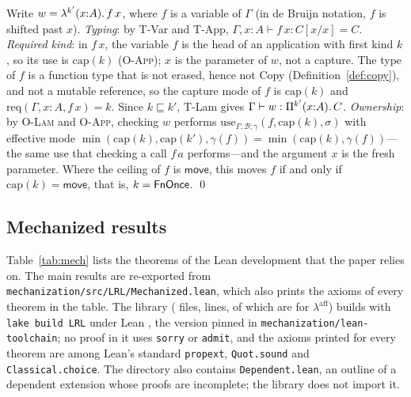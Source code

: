 Write $w = \lambda^{k'}(x{:}A).\,f\,x$, where $f$ is a variable of $\Gamma$ (in de Bruijn notation, $f$ is shifted past $x$).
\emph{Typing}: by T-Var and T-App, $\Gamma, x{:}A \vdash f\,x : C[x/x] = C$.
\emph{Required kind}: in $f\,x$, the variable $f$ is the head of an application with first kind $k$, so its use is $\mathrm{cap}(k)$ (\textsc{O-App}); $x$ is the parameter of $w$, not a capture.
The type of $f$ is a function type that is not erased, hence not Copy (Definition~\ref{def:copy}), and not a mutable reference, so the capture mode of $f$ is $\mathrm{cap}(k)$ and $\mathrm{req}(\Gamma, x{:}A, f\,x) = k$.
Since $k \sqsubseteq k'$, T-Lam gives $\Gamma \vdash w : \Pi^{k'}(x{:}A).\,C$.
\emph{Ownership}: by \textsc{O-Lam} and \textsc{O-App}, checking $w$ performs $\mathrm{use}_{\Gamma;\mathcal{B};\gamma}(f, \mathrm{cap}(k), \sigma)$ with effective mode $\min(\mathrm{cap}(k), \mathrm{cap}(k'), \gamma(f)) = \min(\mathrm{cap}(k), \gamma(f))$---the same use that checking a call $f\,a$ performs---and the argument $x$ is the fresh parameter.
Where the ceiling of $f$ is $\mathsf{move}$, this moves $f$ if and only if $\mathrm{cap}(k) = \mathsf{move}$, that is, $k = \mathsf{FnOnce}$. \qed

\subsection*{Mechanized results}

Table~\ref{tab:mech} lists the theorems of the Lean development that the paper relies on.
The main results are re-exported from \texttt{mechanization/src/LRL/Mechanized.lean}, which also prints the axioms of every theorem in the table.
The library (\NumLeanFiles{} files, \NumLeanLines{} lines, of which \NumAffineLines{} are for $\lambda^{\mathrm{aff}}$) builds with \texttt{lake build LRL} under Lean \LeanToolchain, the version pinned in \texttt{mechanization/lean-toolchain}; no proof in it uses \lstinline|sorry| or \lstinline|admit|, and the axioms printed for every theorem are among Lean's standard \texttt{propext}, \texttt{Quot.sound} and \texttt{Classical.choice}.
The directory also contains \texttt{Dependent.lean}, an outline of a dependent extension whose proofs are incomplete; the library does not import it.

